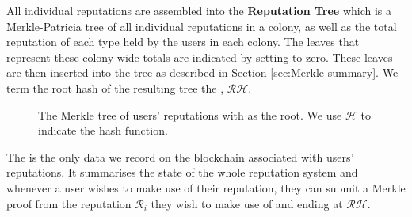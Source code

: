 All individual reputations are assembled into the \textbf{Reputation Tree} which is a Merkle-Patricia tree of all individual reputations in a colony, as well as the total reputation of each type held by the users in each colony. The leaves that represent these colony-wide totals are indicated by setting  to zero. These leaves are then inserted into the tree as described in Section \ref{sec:Merkle-summary}. We term the root hash of the resulting tree the , $\mathcal{RH}$.
\begin{figure}
\centering
{}
\caption{The Merkle tree of users' reputations with  as the root. We use $\mathcal{H}$ to indicate the  hash function.}
\end{figure}


The  is the only data we record on the blockchain associated with users' reputations. It summarises the state of the whole reputation system and whenever a user wishes to make use of their reputation, they can submit a Merkle proof from the reputation $\mathcal{R}_i$ they wish to make use of and ending at $\mathcal{RH}$.

